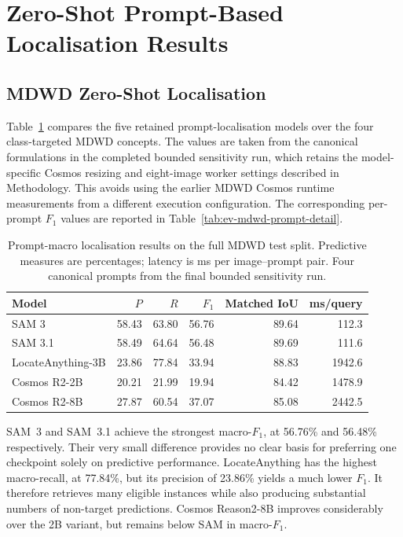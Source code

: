 \section{Zero-Shot Prompt-Based Localisation Results}
\label{sec:ev-prompt}
\subsection{MDWD Zero-Shot Localisation}
\label{sec:ev-mdwd-prompt}
Table~\ref{tab:ev-mdwd-prompt-macro} compares the five retained prompt-localisation models over the four class-targeted \gls{MDWD} concepts. The values are taken from the canonical formulations in the completed bounded sensitivity run, which retains the model-specific Cosmos resizing and eight-image worker settings described in Methodology. This avoids using the earlier MDWD Cosmos runtime measurements from a different execution configuration. The corresponding per-prompt \(F_1\) values are reported in Table~\ref{tab:ev-mdwd-prompt-detail}.

\begin{table}[htbp]
\centering
\small
\caption{Prompt-macro localisation results on the full \gls{MDWD} test split. Predictive measures are percentages; latency is ms per image--prompt pair. Four canonical prompts from the final bounded sensitivity run.}
\label{tab:ev-mdwd-prompt-macro}
\renewcommand{\arraystretch}{1.15}
\begin{tabularx}{\textwidth}{@{}>{\raggedright\arraybackslash}Xrrrrr@{}}
\toprule
Model & $P$ & $R$ & $F_1$ & Matched \gls{IoU} & ms/query \\
\midrule
SAM 3 & 58.43 & 63.80 & 56.76 & 89.64 & 112.3 \\
SAM 3.1 & 58.49 & 64.64 & 56.48 & 89.69 & 111.6 \\
LocateAnything-3B & 23.86 & 77.84 & 33.94 & 88.83 & 1942.6 \\
Cosmos R2-2B & 20.21 & 21.99 & 19.94 & 84.42 & 1478.9 \\
Cosmos R2-8B & 27.87 & 60.54 & 37.07 & 85.08 & 2442.5 \\
\bottomrule
\end{tabularx}
\end{table}


SAM~3 and SAM~3.1 achieve the strongest macro-\(F_1\), at 56.76\% and 56.48\% respectively. Their very small difference provides no clear basis for preferring one checkpoint solely on predictive performance. LocateAnything has the highest macro-recall, at 77.84\%, but its precision of 23.86\% yields a much lower \(F_1\). It therefore retrieves many eligible instances while also producing substantial numbers of non-target predictions. Cosmos Reason2-8B improves considerably over the 2B variant, but remains below SAM in macro-\(F_1\).

